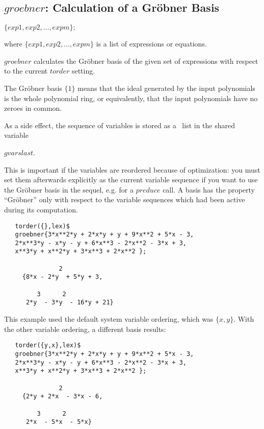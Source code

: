 \subsection{$groebner$: Calculation of a Gr\"obner Basis}
\begin{description}
\item[{\it groebner}] $\{exp1, exp2, \ldots , expm\}; $

where $\{exp1, exp2, \ldots , expm\}$ is a list of
expressions or equations.

$groebner$ calculates the Gr\"obner basis of the given set of
expressions with respect to the current $torder$ setting.

The Gr\"obner basis $\{1\}$ means that the ideal generated by the
input polynomials is the whole polynomial ring, or equivalently, that
the input polynomials have no zeroes in common.

As a side effect, the sequence of variables is stored as a \REDUCE \  list
in the shared variable
\begin{center}
$gvarslast$.
\end{center}

This is important if the variables are reordered because of optimization:
you must set them afterwards explicitly as the current variable sequence
if you want to use the Gr\"obner basis in the sequel, e.g. for a
$preduce$ call. A basis has the property ``Gr\"obner'' only with respect
to the variable sequences which had been active during its computation.
\end{description}

\example {}
\begin{verbatim}
   torder({},lex)$
   groebner{3*x**2*y + 2*x*y + y + 9*x**2 + 5*x - 3,
   2*x**3*y - x*y - y + 6*x**3 - 2*x**2 - 3*x + 3,
   x**3*y + x**2*y + 3*x**3 + 2*x**2 };

               2
     {8*x - 2*y  + 5*y + 3,

         3      2
      2*y  - 3*y  - 16*y + 21}
\end{verbatim}


This example used the default system variable ordering, which was
$\{x,y\}$. With the other variable ordering, a different basis results:

\begin{verbatim}
   torder({y,x},lex)$
   groebner{3*x**2*y + 2*x*y + y + 9*x**2 + 5*x - 3,
   2*x**3*y - x*y - y + 6*x**3 - 2*x**2 - 3*x + 3,
   x**3*y + x**2*y + 3*x**3 + 2*x**2 };

               2
     {2*y + 2*x  - 3*x - 6,

         3      2
      2*x  - 5*x  - 5*x}
\end{verbatim}


